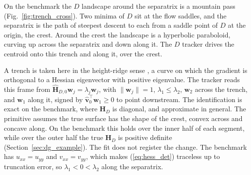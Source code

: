 \documentclass[lettersize,journal]{IEEEtran}
\begin{document}
On the benchmark the $D$ landscape around the separatrix is a mountain
pass (Fig.~\ref{fig:trench_cross}). Two minima of $D$ sit at the flow
saddles, and the separatrix is the path of steepest descent to each from
a saddle point of $D$ at the origin, the crest. Around the crest the
landscape is a hyperbolic paraboloid, curving up across the separatrix
and down along it. The $D$ tracker drives the centroid onto this trench
and along it, over the crest.

A trench is taken here in the height-ridge sense \cite{35}, a curve on
which the gradient is orthogonal to a Hessian eigenvector with positive
eigenvalue. The tracker reads this frame from
$\hat{\mathbf{H}}_{D,0}\mathbf{w}_j = \lambda_j \mathbf{w}_j$, with
$\|\mathbf{w}_j\| = 1$, $\lambda_1 \leq \lambda_2$, $\mathbf{w}_2$ across
the trench, and $\mathbf{w}_1$ along it, signed by
$\hat{\mathbf{v}}_0^\top \mathbf{w}_1 \geq 0$ to point downstream. The
identification is exact on the benchmark, where $\mathbf{H}_D$ is
diagonal, and approximate in general. The primitive assumes the true
surface has the shape of the crest, convex across and concave along. On
the benchmark this holds over the inner half of each segment, while over
the outer half the true $\mathbf{H}_D$ is positive definite
(Section~\ref{sec:dg_example}). The fit does not register the change.
The benchmark has $u_{xx} = u_{yy}$ and $v_{xx} = v_{yy}$, which makes
(\ref{eq:hess_det}) traceless up to truncation error, so
$\lambda_1 < 0 < \lambda_2$ along the separatrix.
\end{document}
